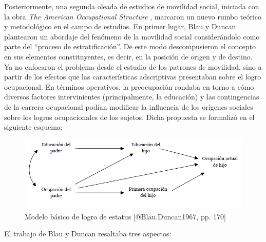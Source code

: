 \documentclass[
]{book}
\begin{document}
Posteriormente, una segunda oleada de estudios de movilidad social, iniciada con la obra \emph{The American Occupational Structure} \citep{Blau.Duncan1967}, marcaron un nuevo rumbo teórico y metodológico en el campo de estudios. En primer lugar, Blau y Duncan plantearon un abordaje del fenómeno de la movilidad social considerándolo como parte del ``proceso de estratificación''. De este modo descompusieron el concepto en sus elementos constituyentes, es decir, en la posición de origen y de destino. Ya no enfocaron el problema desde el estudio de los patrones de movilidad, sino a partir de los efectos que las características adscriptivas presentaban sobre el logro ocupacional. En términos operativos, la preocupación rondaba en torno a cómo diversos factores intervinientes (principalmente, la educación) y las contingencias de la carrera ocupacional podían modificar la influencia de los orígenes sociales sobre los logros ocupacionales de los sujetos. Dicha propuesta se formalizó en el siguiente esquema:

\begin{figure}

{\centering \includegraphics[width=0.8\linewidth]{imagenes/blau} 

}

\caption{Modelo básico de logro de estatus [@Blau.Duncan1967, pp. 170]}\label{fig:unnamed-chunk-92}
\end{figure}

El trabajo de Blau y Duncan resaltaba tres aspectos:
\end{document}
